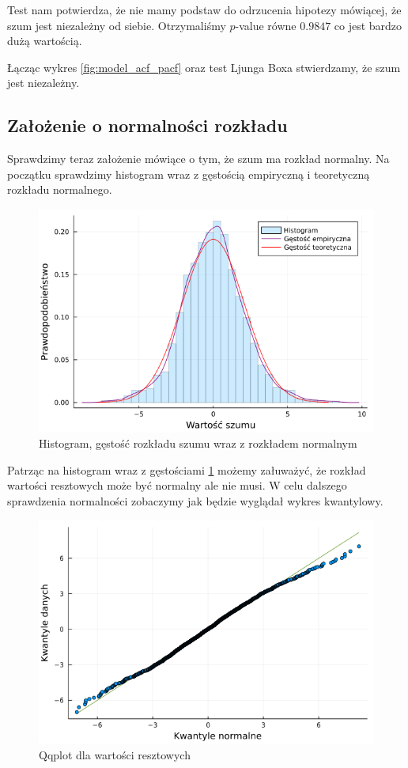 \documentclass[12pt]{article}
\theoremstyle{exer}
\begin{document}
Test nam potwierdza, że nie mamy podstaw do odrzucenia hipotezy mówiącej, że szum jest niezależny od siebie. Otrzymaliśmy $p$-value równe $0.9847$ co jest bardzo dużą wartością.

Łącząc wykres \ref{fig:model_acf_pacf} oraz test Ljunga Boxa stwierdzamy, że szum jest niezależny.

\subsection{Założenie o normalności rozkładu}
Sprawdzimy teraz założenie mówiące o tym, że szum ma rozkład normalny.
Na początku sprawdzimy histogram wraz z gęstością empiryczną i teoretyczną rozkładu normalnego.
\begin{figure}[H]
	\centering
	\includegraphics[width=3\columnwidth/4]{img/density.png}
	\caption{Histogram, gęstość rozkładu szumu wraz z rozkładem normalnym}
	\label{fig:density}
\end{figure}

Patrząc na histogram wraz z gęstościami \ref{fig:density} możemy załuważyć, że rozkład wartości resztowych może być normalny ale nie musi. W celu dalszego sprawdzenia normalności zobaczymy jak będzie wyglądał wykres kwantylowy.

\begin{figure}[H]
	\centering
	\includegraphics[width=3\columnwidth/4]{img/qqplot.png}
	\caption{Qqplot dla wartości resztowych}
	\label{fig:qqplot}
\end{figure}
\end{document}
